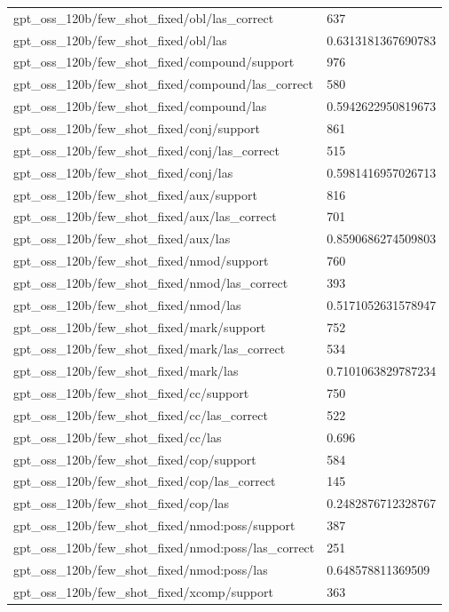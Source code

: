 \begin{tabular}{ll}
gpt\_oss\_120b/few\_shot\_fixed/obl/las\_correct & 637 \\
gpt\_oss\_120b/few\_shot\_fixed/obl/las & 0.6313181367690783 \\
gpt\_oss\_120b/few\_shot\_fixed/compound/support & 976 \\
gpt\_oss\_120b/few\_shot\_fixed/compound/las\_correct & 580 \\
gpt\_oss\_120b/few\_shot\_fixed/compound/las & 0.5942622950819673 \\
gpt\_oss\_120b/few\_shot\_fixed/conj/support & 861 \\
gpt\_oss\_120b/few\_shot\_fixed/conj/las\_correct & 515 \\
gpt\_oss\_120b/few\_shot\_fixed/conj/las & 0.5981416957026713 \\
gpt\_oss\_120b/few\_shot\_fixed/aux/support & 816 \\
gpt\_oss\_120b/few\_shot\_fixed/aux/las\_correct & 701 \\
gpt\_oss\_120b/few\_shot\_fixed/aux/las & 0.8590686274509803 \\
gpt\_oss\_120b/few\_shot\_fixed/nmod/support & 760 \\
gpt\_oss\_120b/few\_shot\_fixed/nmod/las\_correct & 393 \\
gpt\_oss\_120b/few\_shot\_fixed/nmod/las & 0.5171052631578947 \\
gpt\_oss\_120b/few\_shot\_fixed/mark/support & 752 \\
gpt\_oss\_120b/few\_shot\_fixed/mark/las\_correct & 534 \\
gpt\_oss\_120b/few\_shot\_fixed/mark/las & 0.7101063829787234 \\
gpt\_oss\_120b/few\_shot\_fixed/cc/support & 750 \\
gpt\_oss\_120b/few\_shot\_fixed/cc/las\_correct & 522 \\
gpt\_oss\_120b/few\_shot\_fixed/cc/las & 0.696 \\
gpt\_oss\_120b/few\_shot\_fixed/cop/support & 584 \\
gpt\_oss\_120b/few\_shot\_fixed/cop/las\_correct & 145 \\
gpt\_oss\_120b/few\_shot\_fixed/cop/las & 0.2482876712328767 \\
gpt\_oss\_120b/few\_shot\_fixed/nmod:poss/support & 387 \\
gpt\_oss\_120b/few\_shot\_fixed/nmod:poss/las\_correct & 251 \\
gpt\_oss\_120b/few\_shot\_fixed/nmod:poss/las & 0.648578811369509 \\
gpt\_oss\_120b/few\_shot\_fixed/xcomp/support & 363 \\

\end{tabular}
